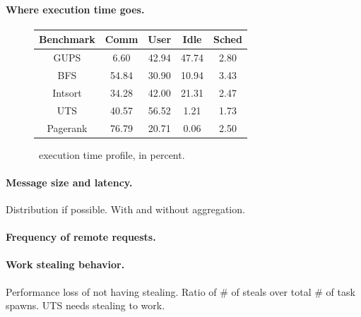 \paragraph{Where execution time goes.}


\begin{figure}[ht]
    \begin{center}
      \begin{tabular}{c|c c c c}
        Benchmark     & Comm & User & Idle & Sched \\ \hline
        GUPS          & 6.60  & 42.94   & 47.74 & 2.80 \\
        BFS           & 54.84 & 30.90   & 10.94 & 3.43 \\ 
        Intsort       & 34.28 & 42.00   & 21.31 & 2.47 \\ 
        UTS           & 40.57 & 56.52   &  1.21 & 1.73 \\
        Pagerank      & 76.79 & 20.71   &  0.06 & 2.50 \\
      \end{tabular}
    \end{center}
    \caption{\Grappa\ execution time profile, in percent.}
    \label{fig:grappa-profile}
\end{figure}


\paragraph{Message size and latency.}
Distribution if possible. With and without aggregation. 

\paragraph{Frequency of remote requests.}

\paragraph{Work stealing behavior.}
Performance loss of not having stealing. Ratio of \# of steals over total \# of task spawns. UTS needs stealing to work. 
















